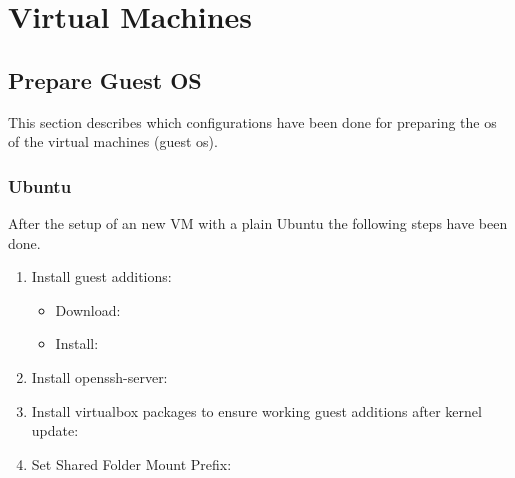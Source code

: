 \chapter{Virtual Machines}

\section{Prepare Guest OS}
This section describes which configurations have been done for preparing the os of the virtual machines (guest os).
\subsection*{Ubuntu}
After the setup of an new VM with a plain Ubuntu the following steps have been done.
\begin{enumerate}
\item Install guest additions:
\begin{itemize}
\item Download: 
\item Install: 
\end{itemize} 
\item Install openssh-server:\\
\item Install virtualbox packages to ensure working guest additions after kernel update:\\ 
\item Set Shared Folder Mount Prefix:\\
\end{enumerate}

